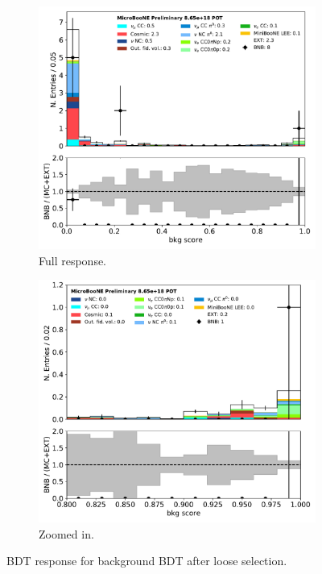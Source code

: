 \documentclass[a4paper]{article}
\begin{document}
\begin{figure}[H] 
\begin{center}
    \begin{subfigure}[b]{0.45\textwidth}
    \centering
    \includegraphics[width=1.00\textwidth]{1e0p/bkg_score_01162020_RUN3_loosesel.pdf}
    \caption{\label{fig:1e0p:bdt:bkgscore:loosenozoom} Full response.}
    \end{subfigure}
    \begin{subfigure}[b]{0.45\textwidth}
    \centering
    \includegraphics[width=1.00\textwidth]{1e0p/bkg_score_01162020_RUN3_loosesel_zoom.pdf}
    \caption{\label{fig:1e0p:bdt:bkgscore:loosezoom} Zoomed in.}
    \end{subfigure}
\caption{\label{fig:1e0p:bdt:loose} BDT response for background BDT after loose selection.}
\end{center}
\end{figure}
\end{document}
